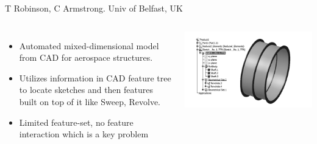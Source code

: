 \begin{frame}[<+-| alert@+>]{T Robinson, C Armstrong. Univ of Belfast, UK \cite{Robinson2007}}

\begin{columns}[T]

	\begin{itemize}[noitemsep,label=\textbullet,topsep=2pt,parsep=2pt,partopsep=2pt]
	\item Automated mixed-dimensional model from CAD for aerospace structures.
	\item Utilizes information in CAD feature tree to locate sketches and then features built on top of it like Sweep, Revolve.
	\item Limited feature-set, no feature interaction which is a key problem
	\end{itemize}
	\includegraphics[scale=0.5]{../Common/images/Robinson.png}
\end{columns}

\end{frame}


